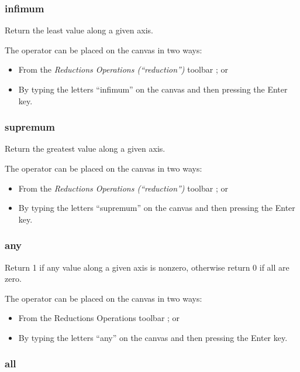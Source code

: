 \subsubsection{infimum}


\label{Operation:infimum} Return the least value along a given axis.

The operator can be placed on the canvas in two ways:
\begin{itemize}
\item From the \emph{Reductions Operations (``reduction'')} toolbar ;
or 
\item By typing the letters ``infimum'' on the canvas and then pressing
the Enter key.
\end{itemize}

\subsubsection{supremum}

\label{Operation:supremum} Return the greatest value along a given
axis.


The operator can be placed on the canvas in two ways:
\begin{itemize}
\item From the \emph{Reductions Operations (``reduction'')} toolbar ;
or 
\item By typing the letters ``supremum'' on the canvas and then pressing
the Enter key.
\end{itemize}

\subsubsection{any}


\label{Operation:any} Return 1 if any value along a given axis is
nonzero, otherwise return 0 if all are zero.

The operator can be placed on the canvas in two ways:
\begin{itemize}
\item From the Reductions Operations toolbar ;
or 
\item By typing the letters ``any'' on the canvas and then pressing the
Enter key.
\end{itemize}

\subsubsection{all}

